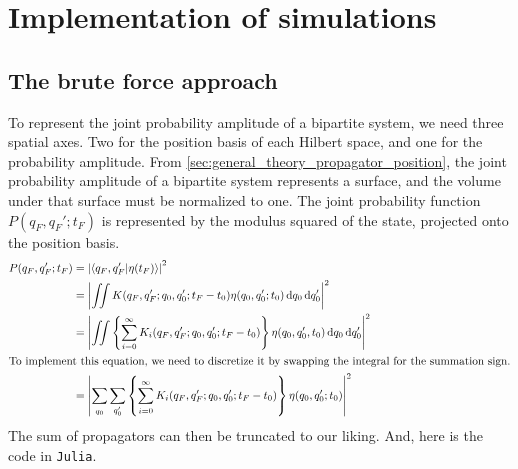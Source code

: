 \chapter{Implementation of simulations}
\label{sec:implementation_of_simulation}

\section{The brute force approach}

To represent the joint probability amplitude of a bipartite system, we need three spatial axes. Two for the position basis of each Hilbert space, and one for the probability amplitude. From \cref{sec:general_theory_propagator_position}, the joint probability amplitude of a bipartite system represents a surface, and the volume under that surface must be normalized to one. The joint probability function $P(q_F, q_F'; t_F)$ is represented by the modulus squared of the state, projected onto the position basis.
\begin{align}
    P(q_F, q_F'; t_F) &= \left|\braket{q_F, q_F'}{\eta(t_F)}\right|^2 \\
    &= \left|\iint K(q_F, q_F'; q_0, q_0'; t_F - t_0)\eta(q_0, q_0'; t_0)\dd{q_0}\dd{q_0'}\right|^2 \\
    &= \left|\iint \left\{\sum_{i = 0}^{\infty}K_i(q_F, q_F'; q_0, q_0'; t_F - t_0)\right\}\eta(q_0, q_0', t_0)\dd{q_0}\dd{q_0'}\right|^2 \\
    \intertext{To implement this equation, we need to discretize it by swapping the integral for the summation sign.}
    &= \left|\sum_{\vphantom{q_0'}q_0}\sum_{q_0'}\left\{\sum_{\vphantom{q_0'}i = 0}^{\infty}K_i(q_F, q_F'; q_0, q_0'; t_F - t_0)\right\}\eta(q_0, q_0'; t_0)\right|^2 \label{eq:computation_brute_force}
\end{align}
The sum of propagators can then be truncated to our liking. And, here is the code in \texttt{Julia}.
